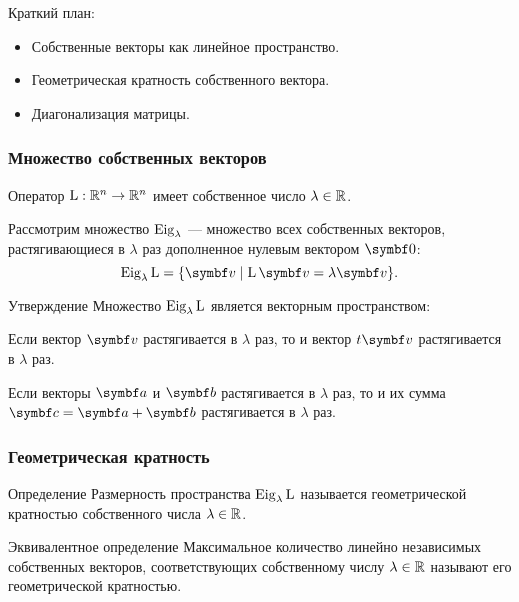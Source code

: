 
\begin{frame} %


\end{frame}



\begin{frame}{Краткий план:}
  \begin{itemize}[<+->]
    \item Собственные векторы как линейное пространство. 
    \item Геометрическая кратность собственного вектора.
    \item Диагонализация матрицы.
  \end{itemize}

\end{frame}


\begin{frame}
    \frametitle{Множество собственных векторов}

    Оператор $\operatorname{L} :\mathbb{R}^n \to \mathbb{R}^n$ имеет собственное число $\lambda \in \mathbb{R}$.
    
    Рассмотрим множество $\operatorname{Eig}_\lambda$ — множество всех собственных векторов, растягивающиеся 
    в $\lambda$ раз дополненное нулевым вектором $\bzero$:
    \[
        \eig_\lambda \LL = \{ \bv \mid \LL \bv = \lambda \bv \}.
    \]

    \pause

    \begin{block}{Утверждение}
        Множество $\operatorname{Eig}_{\lambda} \operatorname{L}$ является векторным пространством:
        \pause

        Если вектор $\bv$ растягивается в $\lambda$ раз, то и вектор $t \bv$ растягивается в $\lambda$ раз.
        \pause

       Если векторы $\ba$ и $\bb$ растягивается в $\lambda$ раз, 
       то и их сумма $\bc = \ba + \bb$ растягивается в $\lambda$ раз.
    \end{block}

    

\end{frame}


\begin{frame}
    \frametitle{Геометрическая кратность}

    \begin{block}{Определение}
        Размерность пространства $\operatorname{Eig}_\lambda \operatorname{L}$ называется
        \alert{геометрической кратностью} собственного числа $\lambda \in \mathbb{R}$.        
    \end{block}

    \pause
    \begin{block}{Эквивалентное определение}
        Максимальное количество линейно независимых собственных векторов,
        соответствующих собственному числу $\lambda  \in \mathbb{R}$ называют его 
        \alert{геометрической кратностью}.        
    \end{block}

\end{frame}


